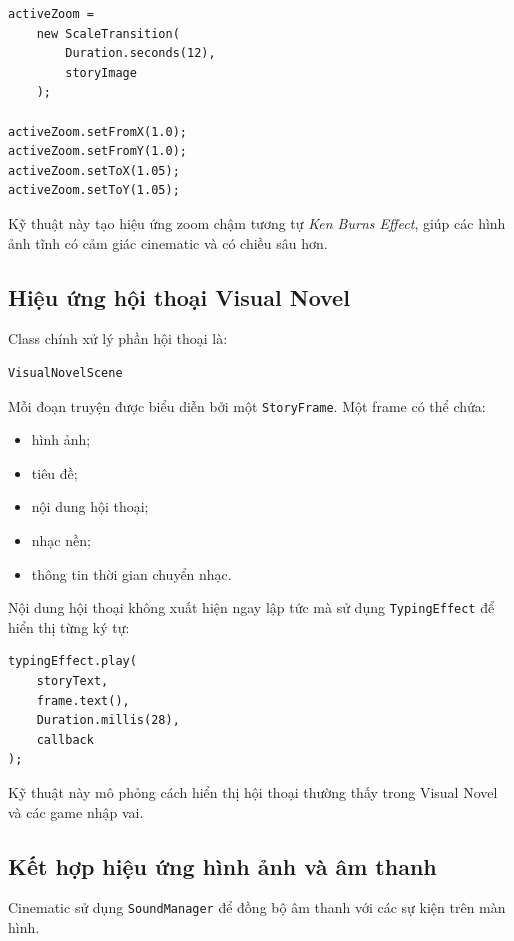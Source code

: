 \documentclass[12pt,a4paper]{report}
\begin{document}
    \begin{verbatim}
activeZoom =
    new ScaleTransition(
        Duration.seconds(12),
        storyImage
    );

activeZoom.setFromX(1.0);
activeZoom.setFromY(1.0);
activeZoom.setToX(1.05);
activeZoom.setToY(1.05);
    \end{verbatim}

    Kỹ thuật này tạo hiệu ứng zoom chậm tương tự
    \textit{Ken Burns Effect}, giúp các hình ảnh tĩnh có cảm giác
    cinematic và có chiều sâu hơn.

    \subsection{Hiệu ứng hội thoại Visual Novel}

    Class chính xử lý phần hội thoại là:

    \begin{verbatim}
VisualNovelScene
    \end{verbatim}

    Mỗi đoạn truyện được biểu diễn bởi một \texttt{StoryFrame}.
    Một frame có thể chứa:

    \begin{itemize}
        \item hình ảnh;
        \item tiêu đề;
        \item nội dung hội thoại;
        \item nhạc nền;
        \item thông tin thời gian chuyển nhạc.
    \end{itemize}

    Nội dung hội thoại không xuất hiện ngay lập tức mà sử dụng
    \texttt{TypingEffect} để hiển thị từng ký tự:

    \begin{verbatim}
typingEffect.play(
    storyText,
    frame.text(),
    Duration.millis(28),
    callback
);
    \end{verbatim}

    Kỹ thuật này mô phỏng cách hiển thị hội thoại thường thấy trong
    Visual Novel và các game nhập vai.

    \subsection{Kết hợp hiệu ứng hình ảnh và âm thanh}

    Cinematic sử dụng \texttt{SoundManager} để đồng bộ âm thanh
    với các sự kiện trên màn hình.
\end{document}
